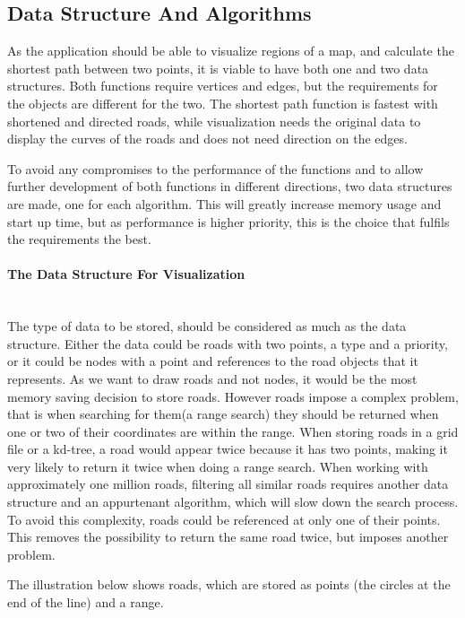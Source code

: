 \documentclass[a4paper,10pt,titlepage]{article}
\begin{document}
			\subsection{Data Structure And Algorithms}
			As the application should be able to visualize regions of a map, and calculate the shortest path between two points, it is viable to have both one and two data structures. Both functions require vertices and edges, but the requirements for the objects are different for the two. The shortest path function is fastest with shortened and directed roads, while visualization needs the original data to display the curves of the roads and does not need direction on the edges.

 To avoid any compromises to the performance of the functions and to allow further development of both functions in different directions, two data structures are made, one for each algorithm. This will greatly increase memory usage and start up time, but as performance is higher priority, this is the choice that fulfils the requirements the best.

\paragraph{The Data Structure For Visualization}\mbox{}\\
The type of data to be stored, should be considered as much as the data structure. Either the data could be roads with two points, a type and a priority, or it could be nodes with a point and references to the road objects that it represents. As we want to draw roads and not nodes, it would be the most memory saving decision to store roads. However roads impose a complex problem, that is when searching for them(a range search) they should be returned when one or two of their coordinates are within the range. When storing roads in a grid file or a kd-tree, a road would appear twice because it has two points, making it very likely to return it twice when doing a range search. When working with approximately one million roads, filtering all similar roads requires another data structure and an appurtenant algorithm, which will slow down the search process. To avoid this complexity, roads could be referenced at only one of their points. This removes the possibility to return the same road twice, but imposes another problem.

The illustration below shows roads, which are stored as points (the circles at the end of the line) and a range.
\end{document}
